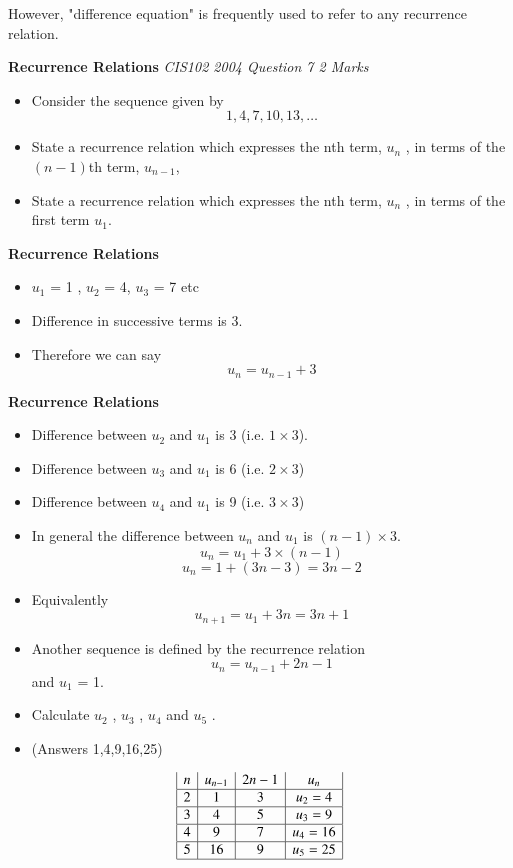 \documentclass[12pt]{article}
\begin{document}
However, "difference equation" is frequently used to refer to any recurrence relation.




\noindent \textbf{Recurrence Relations}
\textit{CIS102 2004 Question 7 2 Marks}


\begin{itemize}
\item Consider the sequence given by \[ 1, 4, 7, 10, 13, \ldots\]
\item State a recurrence relation which expresses the nth term, $u_n$
, in terms of the$(n - 1)$th term, $u_{n-1}$, 
\item State a recurrence relation which expresses the nth term, $u_n$
, in terms of the first term $u_1$.
\end{itemize}



\noindent \textbf{Recurrence Relations}

\begin{itemize}
\item $u_1$ = 1 , $u_2$ = 4, $u_3$ = 7 etc 
\item Difference in successive terms is 3.
\item Therefore we can say 
\[ u_n = u_{n-1} + 3 \]
\end{itemize}


\noindent \textbf{Recurrence Relations}

\begin{itemize}
\item Difference between $u_2$ and $u_1$ is 3 (i.e. $1 \times 3$).
\item Difference between $u_3$ and $u_1$ is 6 (i.e. $2 \times 3$)
\item Difference between $u_4$ and $u_1$ is 9 (i.e. $3 \times 3$)
\item In general the difference between $u_n$ and $u_1$ is $(n-1)\times 3$.
\[ u_{n} = u_1 + 3 \times (n-1) \]
\[ u_{n} = 1 + (3n-3) = 3n-2\]
\item Equivalently
\[ u_{n+1} = u_1 + 3n = 3n+1\]
\end{itemize}

\begin{itemize}
\item Another sequence is defined by the recurrence relation 
\[ u_n = u_{n-1} + 2n-1 \] and
$u_1$ = 1.
\item Calculate $u_2$ , $u_3$ , $u_4$  and $u_5$ .
\item (Answers 1,4,9,16,25)
\end{itemize}

\[\begin{array}{|c|c|c|c|}
n    & u_{n-1} & 2n-1 & u_n \\ \hline
2      & 1         &  3   & u_2 = 4 \\ \hline
3      & 4         &  5   & u_3 = 9 \\ \hline
4      & 9         &  7   & u_4 = 16 \\ \hline
5      & 16        &  9   & u_5 = 25 \\ \hline
\end{array}\]
\end{document}
